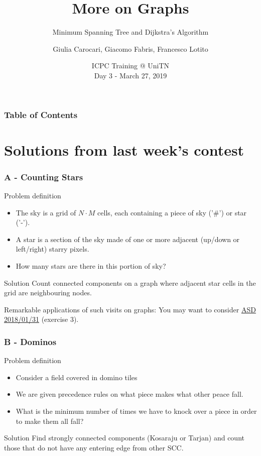 \documentclass{beamer}
\title{More on Graphs}
\subtitle{Minimum Spanning Tree and Dijkstra's Algorithm}
\author[Carocari, Fabris, Lotito]
{Giulia Carocari, Giacomo Fabris, Francesco Lotito}
\institute[UniTN]{Università degli Studi di Trento}
\date[March 27, 2019]
{ICPC Training @ UniTN\\ Day 3 - March 27, 2019}
\begin{document}
 
  \frame{\titlepage}
  \begin{frame} 
      \frametitle{Table of Contents}
      \tableofcontents
  \end{frame}

  \section{Solutions from last week's contest}
  \begin{frame}
  \frametitle{A - Counting Stars}
  \begin{block}{Problem definition}

  \begin{itemize}
    \item The sky is a grid of  $N\cdot M$ cells, each containing a piece of sky ('\#') or star ('-').
    \item A star is a section of the sky made of one or more adjacent (up/down or left/right) starry pixels.\\
    \item How many stars are there in this portion of sky?
  \end{itemize}
  \end{block}
  \pause
  \begin{block}{Solution}
    Count connected components on a graph where adjacent star cells in the grid are neighbouring nodes.
  \end{block}
  \alert{Remarkable applications of such visits on graphs:}
  You may want to consider \href{http://disi.unitn.it/~montreso/asd/compiti/18-01-31.compito.pdf}{ASD 2018/01/31} (exercise 3).
  \end{frame}

  \begin{frame}
    \frametitle{B - Dominos}
    \begin{block}{Problem definition}

    \begin{itemize}
      \item Consider a field covered in domino tiles
      \item We are given precedence rules on what piece makes what other peace fall.
      \item What is the minimum number of times we have to knock over a piece in order to make them all fall?
    \end{itemize}
    \end{block}
    \pause
    \begin{block}{Solution}
      Find strongly connected components (Kosaraju or Tarjan) and count those that do not have any entering
      edge from other SCC.
    \end{block}
  \end{frame}
\end{document}
